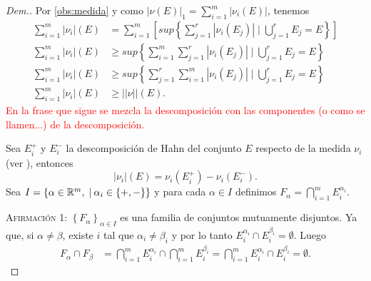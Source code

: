 \begin{proof}[Dem.]
    Por  \eqref{obs:medida} y como $\displaystyle|\nu(E)|_1= \sum_{i=1}^{m}|\nu_i(E)|$, tenemos
    \begin{equation*}
    \begin{split}
       \sum_{i=1}^{m} |\nu_i|(E)&=\sum_{i=1}^{m} \left[sup\left\{ \sum_{j=1}^r |\nu_i(E_j)| \mid \bigcup_{j=1}^rE_j=E\right\} \right]\\
       \sum_{i=1}^{m} |\nu_i|(E) &\geq sup\left\{ \sum_{i=1}^{m} \sum_{j=1}^r |\nu_i(E_j)| \mid \bigcup_{j=1}^rE_j=E \right\}\\
       \sum_{i=1}^{m} |\nu_i|(E) &\geq sup\left\{  \sum_{j=1}^r \sum_{i=1}^{m} |\nu_i(E_j)| \mid \bigcup_{j=1}^rE_j=E \right\}\\
       \sum_{i=1}^{m} |\nu_i|(E) &\geq ||\nu||(E).
    \end{split}
    \end{equation*}
    \textcolor{red}{En la frase que sigue se mezcla la descomposición con las componentes (o como se llamen...) de la descomposición.}
    
Sea $E_i^{+}$ y $E_i^-$  la descomposición de Hahn del conjunto $E$ respecto de la medida $\nu_i$ (ver \cite{folland}), entonces \begin{equation}\label{eq:med_vec 1}
    |\nu_i|(E)=\nu_i(E_i^+)-\nu_i(E_i^-).
\end{equation}    
 Sea $I=\{\alpha\in\mathbb{R}^m,  \; | \: \alpha_i\in\{+,-\} \}$ y para cada $\alpha\in I$  definimos  $F_\alpha=\displaystyle\bigcap_{i=1}^mE_i^{\alpha_i}$. 
 
\textsc{Afirmación 1:}  $\left\lbrace F_\alpha\right\rbrace _{\alpha\in I}$ es una familia de conjuntos mutuamente disjuntos.
Ya que, si  $\alpha\neq\beta$, existe $i$ tal que  $\alpha_i\neq\beta_i$  y por lo tanto $E_i^{\alpha_i}\cap E_i^{\beta_i}=\emptyset$. Luego
  \begin{equation*}
  	\begin{split}
  		F_\alpha\cap F_\beta&=\bigcap_{i=1}^mE_i^{\alpha_i}\cap \bigcap_{i=1}^mE_i^{\beta_i}=\bigcap_{i=1}^mE_i^{\alpha_i}\cap E_i^{\beta_i}=\emptyset.
  	\end{split}
  \end{equation*}
  


\end{proof}

